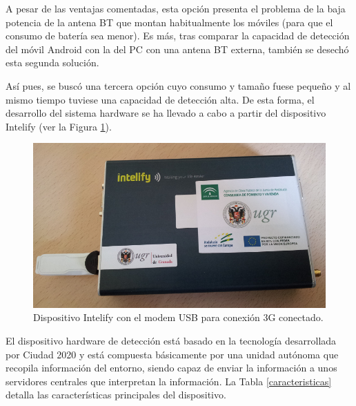 \documentclass[twocolumn,twoside]{Jornadas}
\begin{document}
A pesar de las ventajas comentadas, esta opción presenta el problema de la baja potencia de la antena BT que montan habitualmente los móviles (para que el consumo de batería sea menor). Es más, tras comparar la capacidad de detección del móvil Android con la del PC con una antena BT externa, también se desechó esta segunda solución.


Así pues, se buscó una tercera opción cuyo consumo y tamaño fuese pequeño y al mismo tiempo tuviese una capacidad de detección alta. 
De esta forma, el desarrollo del sistema hardware se ha llevado a cabo a partir del dispositivo Intelify \cite{intelify} (ver la Figura \ref{intelify}).

\begin{figure}[htpb] 
\begin{center} 
\includegraphics[scale=0.25]{intelifychisme1.png}
\end{center} 
\caption{Dispositivo Intelify con el modem USB para conexión 3G conectado.} 
\label{intelify} 
\end{figure}


El dispositivo hardware de detección está basado en la tecnología desarrollada por Ciudad 2020 \cite{cityanalytics,Blobject} y está compuesta básicamente por una unidad autónoma que recopila información del entorno, siendo capaz de enviar la información a unos servidores centrales que interpretan la información. 
La Tabla \ref{caracteristicas} detalla las características principales del dispositivo.
\end{document}

